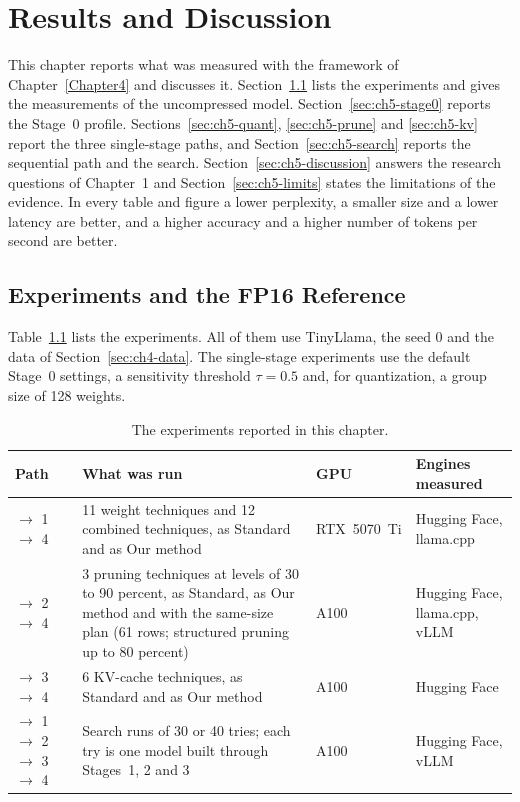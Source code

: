 \chapter{Results and Discussion}
\label{Chapter5}

This chapter reports what was measured with the framework of Chapter~\ref{Chapter4} and discusses it. Section~\ref{sec:ch5-experiments} lists the experiments and gives the measurements of the uncompressed model. Section~\ref{sec:ch5-stage0} reports the Stage~0 profile. Sections~\ref{sec:ch5-quant}, \ref{sec:ch5-prune} and \ref{sec:ch5-kv} report the three single-stage paths, and Section~\ref{sec:ch5-search} reports the sequential path and the search. Section~\ref{sec:ch5-discussion} answers the research questions of Chapter~1 and Section~\ref{sec:ch5-limits} states the limitations of the evidence. In every table and figure a lower perplexity, a smaller size and a lower latency are better, and a higher accuracy and a higher number of tokens per second are better.

\section{Experiments and the FP16 Reference}
\label{sec:ch5-experiments}

Table~\ref{tab:ch5-experiments} lists the experiments. All of them use TinyLlama, the seed 0 and the data of Section~\ref{sec:ch4-data}. The single-stage experiments use the default Stage~0 settings, a sensitivity threshold $\tau = 0.5$ and, for quantization, a group size of 128 weights.

\begin{table}[htbp]
\centering
\small
\caption{The experiments reported in this chapter.}
\label{tab:ch5-experiments}
\renewcommand{\arraystretch}{1.2}
\begin{tabularx}{\textwidth}{>{\raggedright\arraybackslash}p{2.9cm}X>{\raggedright\arraybackslash}p{1.7cm}>{\raggedright\arraybackslash}p{2.7cm}}
\hline
\textbf{Path} & \textbf{What was run} & \textbf{GPU} & \textbf{Engines measured} \\
\hline
0 $\rightarrow$ 1 $\rightarrow$ 4 & 11 weight techniques and 12 combined techniques, as Standard and as Our method & RTX~5070~Ti & Hugging Face, llama.cpp \\
0 $\rightarrow$ 2 $\rightarrow$ 4 & 3 pruning techniques at levels of 30 to 90 percent, as Standard, as Our method and with the same-size plan (61 rows; structured pruning up to 80 percent) & A100 & Hugging Face, llama.cpp, vLLM \\
0 $\rightarrow$ 3 $\rightarrow$ 4 & 6 KV-cache techniques, as Standard and as Our method & A100 & Hugging Face \\
0 $\rightarrow$ 1 $\rightarrow$ 2 $\rightarrow$ 3 $\rightarrow$ 4 & Search runs of 30 or 40 tries; each try is one model built through Stages~1, 2 and 3 & A100 & Hugging Face, vLLM \\
\hline
\end{tabularx}
\end{table}

